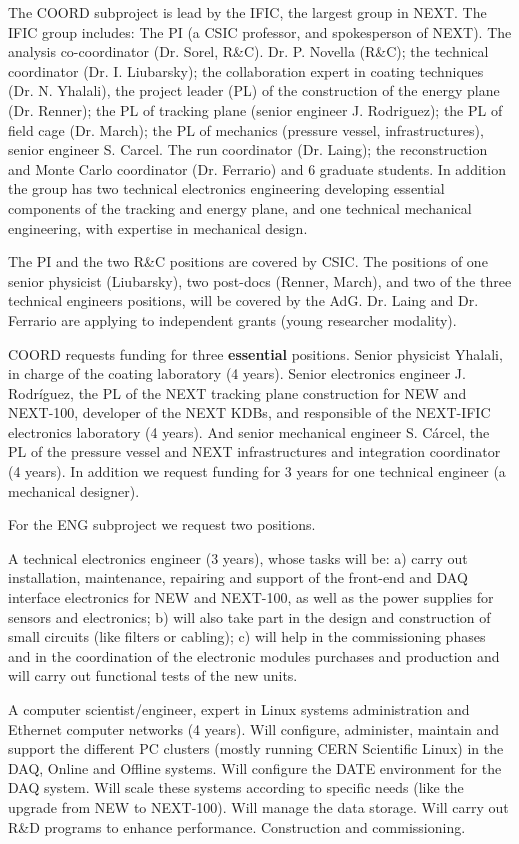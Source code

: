 The COORD subproject is lead by the IFIC, the largest group in NEXT. The IFIC group includes: The PI (a CSIC professor, and spokesperson of NEXT). The analysis co-coordinator (Dr. Sorel, R\&C). Dr. P. Novella (R\&C); the technical coordinator (Dr. I. Liubarsky); the collaboration expert in coating techniques (Dr. N. Yhalali), the project leader (PL) of the construction of the energy plane (Dr. Renner); the PL of tracking plane (senior engineer J. Rodriguez); the PL of field cage (Dr. March); the PL of mechanics (pressure vessel, infrastructures), senior engineer S. Carcel. The run coordinator (Dr. Laing); the reconstruction and Monte Carlo coordinator (Dr. Ferrario) and 6 graduate students. In addition the group has two technical electronics engineering developing essential components of the tracking and energy plane, and one technical mechanical engineering, with expertise in mechanical design. 

The PI and the two R\&C positions are covered by CSIC. The positions of one senior physicist (Liubarsky), two post-docs (Renner, March), and two of the three technical engineers positions, will be covered by the AdG. Dr. Laing and Dr. Ferrario are applying to independent grants (young researcher modality). 

COORD requests funding for three {\bf essential} positions. Senior physicist Yhalali, in charge of the coating laboratory (4 years). Senior electronics engineer J. Rodríguez, the PL of the NEXT tracking plane construction for NEW and NEXT-100, developer of the NEXT KDBs, and responsible of the NEXT-IFIC electronics laboratory (4 years). And senior mechanical engineer S. Cárcel, the PL of the pressure vessel and NEXT infrastructures and integration coordinator (4 years). In addition we request funding for 3 years for one technical engineer (a mechanical designer).  

For the ENG subproject we request two positions.

A technical electronics engineer (3 years), whose tasks will be: a) carry out installation, maintenance, repairing and support of the front-end and DAQ interface electronics for NEW and NEXT-100, as well as the power supplies for sensors and electronics; b) will also take part in the design and construction of small circuits (like filters or cabling); c) will help in the commissioning phases and in the coordination of the electronic modules purchases and production and will carry out functional tests of the new units. 

A computer scientist/engineer, expert in Linux systems administration and Ethernet computer networks (4 years). Will configure, administer, maintain and support the different PC clusters (mostly running CERN Scientific Linux) in the DAQ, Online and Offline systems. Will configure the DATE environment for the DAQ system. Will scale these systems according to specific needs (like the upgrade from NEW to NEXT-100). Will manage the data storage. Will carry out R\&D programs to enhance performance. Construction and commissioning. 

